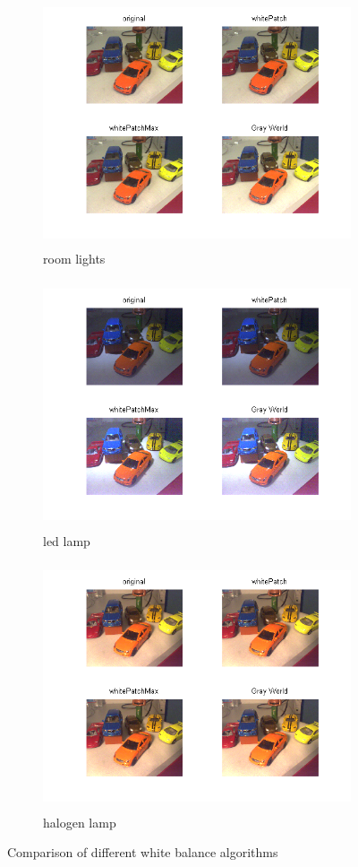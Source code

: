 \documentclass[
a4paper,     %
11pt         %
]{scrartcl}  %
\begin{document}
\newpage
\begin{figure}[ht!]
\centering
\begin{subfigure}{\textwidth}
  \centering
  \includegraphics[trim=40px 40px 40px 0, clip, height=7.3cm]{./Bildg_Messtechnik_Lab/ColorConstancy/html/main_01.png}
  \caption{room lights}
\end{subfigure}
\begin{subfigure}{\textwidth}
  \centering
  \includegraphics[trim=40px 40px 40px 0, clip, height=7.3cm]{./Bildg_Messtechnik_Lab/ColorConstancy/html/main_03.png}
  \caption{led lamp}
\end{subfigure}
\begin{subfigure}{\textwidth}
  \centering
  \includegraphics[trim=40px 40px 40px 0, clip, height=7.3cm]{./Bildg_Messtechnik_Lab/ColorConstancy/html/main_02.png}
  \caption{halogen lamp}
\end{subfigure}
\caption{Comparison of different white balance algorithms}
\label{fig:colConst}
\end{figure}
\FloatBarrier
\end{document}
